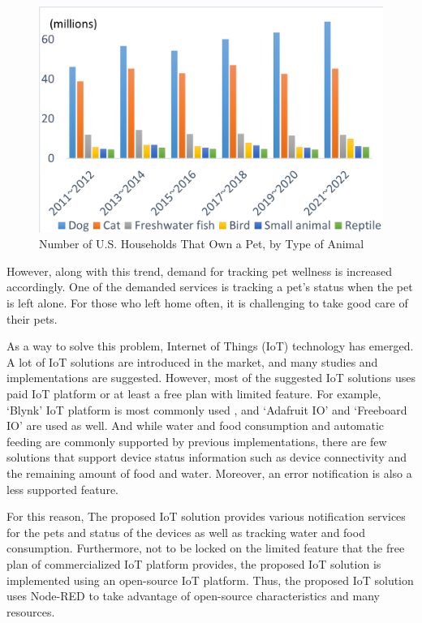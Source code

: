 \documentclass[conference]{IEEEtran}
\begin{document}
\begin{figure}[htbp]
\centerline{\includegraphics{./images/fig 1.png}}
\caption{Number of U.S. Households That Own a Pet, by Type of Animal
}
\label{fig}
\end{figure}

However, along with this trend, demand for tracking pet wellness is increased accordingly. One of the demanded services is tracking a pet’s status when the pet is left alone. For those who left home often, it is challenging to take good care of their pets.

\indent As a way to solve this problem, Internet of Things (IoT) technology has emerged. A lot of IoT solutions are introduced in the market, and many studies and implementations are suggested. However, most of the suggested IoT solutions uses paid IoT platform or at least a free plan with limited feature. For example, ‘Blynk’ IoT platform is most commonly used \cite{b2} \cite{b3} \cite{b4} \cite{b5}, and ‘Adafruit IO’ \cite{b6} and ‘Freeboard IO’ \cite{b7} are used as well. And while water and food consumption and automatic feeding are commonly supported by previous implementations, there are few solutions that support device status information such as device connectivity and the remaining amount of food and water. Moreover, an error notification is also a less supported feature.

For this reason, The proposed IoT solution provides various notification services for the pets and status of the devices as well as tracking water and food consumption. Furthermore, not to be locked on the limited feature that the free plan of commercialized IoT platform provides, the proposed IoT solution is implemented using an open-source IoT platform. Thus, the proposed IoT solution uses Node-RED to take advantage of open-source characteristics and many resources.
\end{document}
